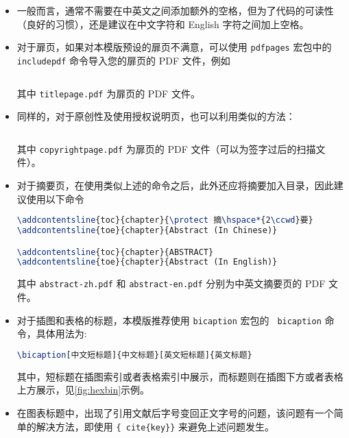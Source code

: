 \begin{itemize}
    \item 一般而言，通常不需要在中英文之间添加额外的空格，但为了代码的可读性（良好的习惯），还是建议在中文字符和 English 字符之间加上空格。
    \item[\textdagger] 对于扉页，如果对本模版预设的扉页不满意，可以使用 \texttt{pdfpages} 宏包中的 \texttt{ includepdf} 命令导入您的扉页的 PDF 文件，例如
\begin{lstlisting}[language=TeX]
% \maketitle

\end{lstlisting}
    其中 \texttt{titlepage.pdf} 为扉页的 PDF 文件。
    \item[\textdagger] 同样的，对于原创性及使用授权说明页，也可以利用类似的方法：
\begin{lstlisting}[language=TeX]
% \makecopyright

\end{lstlisting}
    其中 \texttt{copyrightpage.pdf} 为扉页的 PDF 文件（可以为签字过后的扫描文件）。
    \item[\textdagger] 对于摘要页，在使用类似上述的命令之后，此外还应将摘要加入目录，因此建议使用以下命令
\begin{lstlisting}[language=TeX]
% 
\addcontentsline{toc}{chapter}{\protect 摘\hspace*{2\ccwd}要}
\addcontentsline{toe}{chapter}{Abstract (In Chinese)}

\addcontentsline{toc}{chapter}{ABSTRACT}
\addcontentsline{toe}{chapter}{Abstract (In English)}

\end{lstlisting}
    其中 \texttt{abstract-zh.pdf} 和 \texttt{abstract-en.pdf} 分别为中英文摘要页的 PDF 文件。
    \item 对于插图和表格的标题，本模版推荐使用 \texttt{bicaption} 宏包的 \texttt{ bicaption} 命令，具体用法为:
\begin{lstlisting}[language=TeX]
\bicaption[中文短标题]{中文标题}[英文短标题]{英文标题}
\end{lstlisting}
    其中，短标题在插图索引或者表格索引中展示，而标题则在插图下方或者表格上方展示，见\autoref{fig:hexbin}示例。
    \item 在图表标题中，出现了引用文献后字号变回正文字号的问题，该问题有一个简单的解决方法，即使用 \texttt{\{ cite\{key\}\}} 来避免上述问题发生。
\end{itemize}

